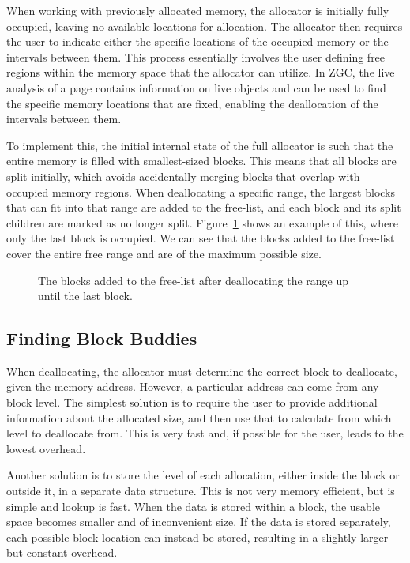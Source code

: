 When working with previously allocated memory, the allocator is initially fully occupied, leaving no available locations for allocation. The allocator then requires the user to indicate either the specific locations of the occupied memory or the intervals between them. This process essentially involves the user defining free regions within the memory space that the allocator can utilize. In ZGC, the live analysis of a page contains information on live objects and can be used to find the specific memory locations that are fixed, enabling the deallocation of the intervals between them.

To implement this, the initial internal state of the full allocator is such that the entire memory is filled with smallest-sized blocks. This means that all blocks are split initially, which avoids accidentally merging blocks that overlap with occupied memory regions. When deallocating a specific range, the largest blocks that can fit into that range are added to the free-list, and each block and its split children are marked as no longer split. Figure~\ref{fig:deallocrange} shows an example of this, where only the last block is occupied. We can see that the blocks added to the free-list cover the entire free range and are of the maximum possible size.

\begin{figure}[h]
    \centering
    
    \caption{The blocks added to the free-list after deallocating the range up until the last block.}
    \label{fig:deallocrange}
\end{figure}

\subsection{Finding Block Buddies} \label{sec:findbuddiesexpl}
When deallocating, the allocator must determine the correct block to deallocate, given the memory address. However, a particular address can come from any block level. The simplest solution is to require the user to provide additional information about the allocated size, and then use that to calculate from which level to deallocate from. This is very fast and, if possible for the user, leads to the lowest overhead.

Another solution is to store the level of each allocation, either inside the block or outside it, in a separate data structure. This is not very memory efficient, but is simple and lookup is fast. When the data is stored within a block, the usable space becomes smaller and of inconvenient size. If the data is stored separately, each possible block location can instead be stored, resulting in a slightly larger but constant overhead.

